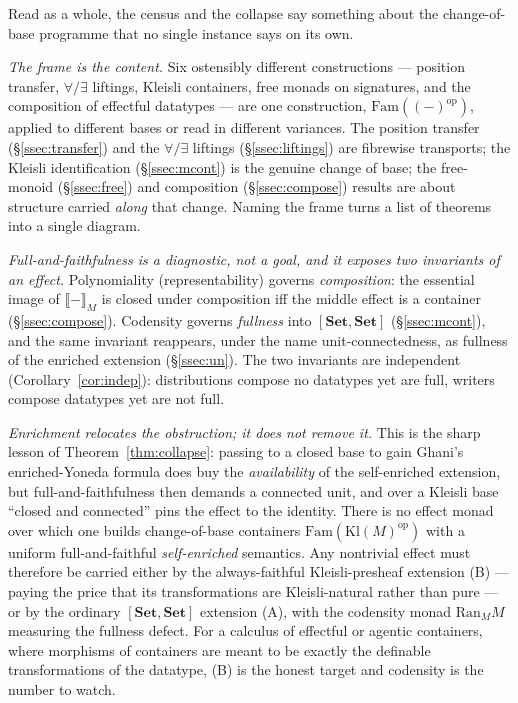 \documentclass[11pt]{amsart}
\theoremstyle{plain}
\theoremstyle{definition}
\theoremstyle{remark}
\newcommand{\Set}{\mathbf{Set}}
\newcommand{\Fam}{\mathrm{Fam}}
\newcommand{\Kl}{\mathrm{Kl}}
\newcommand{\Ran}{\mathrm{Ran}}
\newcommand{\op}{\mathrm{op}}
\newcommand{\extM}[1]{\llbracket #1 \rrbracket_{M}}
\begin{document}
Read as a whole, the census and the collapse say something about the change-of-base programme that no
single instance says on its own.

\emph{The frame is the content.} Six ostensibly different constructions --- position transfer,
$\forall/\exists$ liftings, Kleisli containers, free monads on signatures, and the composition of
effectful datatypes --- are one construction, $\Fam((-)^{\op})$, applied to different bases or read in
different variances. The position transfer (\S\ref{ssec:transfer}) and the $\forall/\exists$ liftings
(\S\ref{ssec:liftings}) are fibrewise transports; the Kleisli identification (\S\ref{ssec:mcont}) is
the genuine change of base; the free-monoid (\S\ref{ssec:free}) and composition
(\S\ref{ssec:compose}) results are about structure carried \emph{along} that change. Naming the frame
turns a list of theorems into a single diagram.

\emph{Full-and-faithfulness is a diagnostic, not a goal, and it exposes two invariants of an effect.}
Polynomiality (representability) governs \emph{composition}: the essential image of $\extM{-}$ is
closed under composition iff the middle effect is a container (\S\ref{ssec:compose}). Codensity governs
\emph{fullness} into $[\Set,\Set]$ (\S\ref{ssec:mcont}), and the same invariant reappears, under the
name unit-connectedness, as fullness of the enriched extension (\S\ref{ssec:un}). The two invariants
are independent (Corollary~\ref{cor:indep}): distributions compose no datatypes yet are full, writers
compose datatypes yet are not full.

\emph{Enrichment relocates the obstruction; it does not remove it.} This is the sharp lesson of
Theorem~\ref{thm:collapse}: passing to a closed base to gain Ghani's enriched-Yoneda formula does buy
the \emph{availability} of the self-enriched extension, but full-and-faithfulness then demands a
connected unit, and over a Kleisli base ``closed and connected'' pins the effect to the identity.
There is no effect monad over which one builds change-of-base containers $\Fam(\Kl(M)^{\op})$ with a
uniform full-and-faithful \emph{self-enriched} semantics. Any nontrivial effect must therefore be
carried either by the always-faithful Kleisli-presheaf extension (B) --- paying the price that its
transformations are Kleisli-natural rather than pure --- or by the ordinary $[\Set,\Set]$ extension
(A), with the codensity monad $\Ran_M M$ measuring the fullness defect. For a calculus of effectful or
agentic containers, where morphisms of containers are meant to be exactly the definable transformations
of the datatype, (B) is the honest target and codensity is the number to watch.
\end{document}
